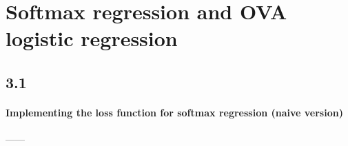 \documentclass{article}
\begin{document}
\section{Softmax regression and OVA logistic regression}
\subsection{3.1}
\paragraph{Implementing the loss function for softmax regression (naive version)}
------\\
\begin{tiny}
\begin{lstlisting}

\end{lstlisting}
\end{tiny}
\end{document}
